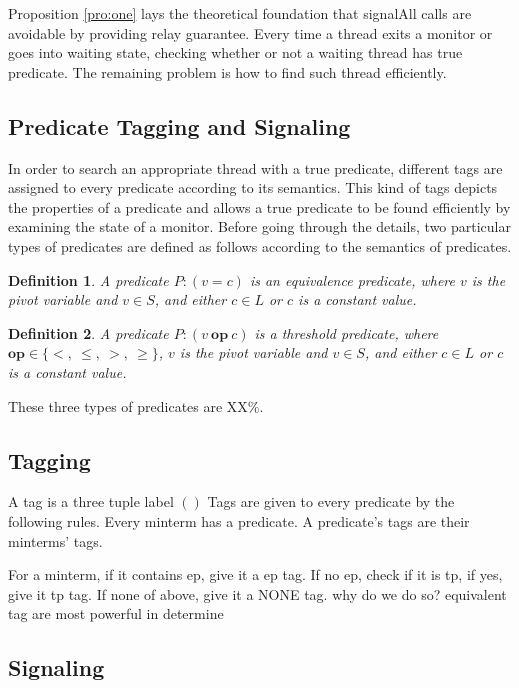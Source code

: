 \documentclass[preprint]{sigplanconf}
\newtheorem{definition}{Definition}
\begin{document}
Proposition \ref{pro:one} lays the theoretical foundation that signalAll calls
are avoidable by providing relay guarantee. Every time a
thread exits a monitor or goes into waiting state, checking whether or not a
waiting thread has true predicate. The remaining problem is how to find such
thread efficiently. 
\subsection{Predicate Tagging and Signaling}
In order to search an appropriate thread with a true predicate, different tags
are assigned to every predicate according to its semantics. This kind of tags
depicts the properties of a predicate and allows a true predicate to be found
efficiently by examining the state of a monitor. Before going through the 
details, two particular types of predicates are defined as follows according to
the semantics of predicates. 
\begin{definition}
    A predicate $P: (v = c)$ is an equivalence predicate, where $v$ is the
    pivot variable and $v \in S$, and either $c \in L$ or $c$ is a constant 
    value.
\end{definition}
\begin{definition}
   A predicate $P: (v\ \boldsymbol{op}\ c)$ is a threshold predicate, where 
   $\boldsymbol{op}
    \in \{<,\ \le,\ >,\ \ge\}$, $v$ is the pivot variable and $v \in S$, and 
    either $c \in L$ or $c$ is a constant value.
\end{definition}

These three types of predicates are XX\%. 
\subsection{Tagging}
A tag is a three tuple label $()$
Tags are given to every predicate by the following rules. 
Every minterm has a predicate. 
A predicate's tags are their minterms' tags. 

For a minterm, 
if it contains ep, give it a ep tag. If no ep, check if it is tp, if yes, give
it tp tag. If none of above, give it a NONE tag. 
why do we do so? equivalent tag are most powerful in determine 

\subsection{Signaling}
\end{document}
